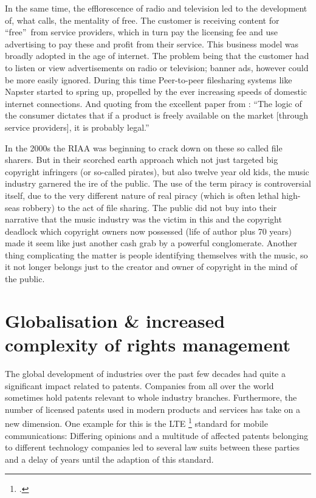 \documentclass[a4paper]{report}
\begin{document}
In the same time, the efflorescence of radio and television led to the development of, what \cite{Lin2013} calls, the mentality of free. The customer is receiving content for \textquotedblleft free\textquotedblright\ from service providers, which in turn pay the licensing fee and use advertising to pay these and profit from their service. This business model was broadly adopted in the age of internet. The problem being that the customer had to listen or view advertisements on radio or television; banner ads, however could be more easily ignored. During this time Peer-to-peer filesharing systems like Napster started to spring up, propelled by the ever increasing speeds of domestic internet connections. And quoting from the excellent paper from \cite{Lunceford2008}: \textquotedblleft The logic of the consumer dictates that if a product is freely available on the market [through service providers], it is probably  legal.\textquotedblright

In the 2000s the RIAA was beginning to crack down on these so called file sharers. But in their scorched earth approach which not just targeted big copyright infringers (or so-called pirates), but also twelve year old kids, the music industry garnered the ire of the public. The use of the term piracy is controversial itself, due to the very different nature of real piracy (which is often lethal high-seas robbery) to the act of file sharing. The public did not buy into their narrative that the music industry was the victim in this and the copyright deadlock which copyright owners now possessed (life of author plus 70 years) made it seem like just another cash grab by a powerful conglomerate. Another thing complicating the matter is people identifying themselves with the music, so it not longer belongs just to the creator and owner of copyright in the mind of the public. \parencite{Lunceford2008}

\section{Globalisation \& increased complexity of rights management}
\label{sec:GlobalRightsMgmt}
The global development of industries over the past few decades had quite a significant impact related to patents. Companies from all over the world sometimes hold patents relevant to whole industry branches. Furthermore, the number of licensed patents used in modern products and services has take on a new dimension. One example for this is the LTE \footcite{Long Term Evolution} standard for mobile communications: Differing opinions and a multitude of affected patents belonging to different technology companies led to several law suits between these parties and a delay of years until the adaption of this standard.
\end{document}
